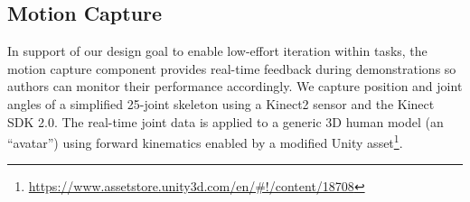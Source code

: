 \subsection{Motion Capture}

In support of our design goal to enable low-effort iteration within tasks, the motion capture component provides real-time feedback during demonstrations so authors can monitor their performance accordingly.
%
We capture position and joint angles of a simplified 25-joint skeleton using a Kinect2 sensor and the Kinect SDK 2.0. %
%
The real-time joint data is applied to a generic 3D human model (an ``avatar'') using forward kinematics enabled by a modified Unity asset\footnote{\url{https://www.assetstore.unity3d.com/en/\#!/content/18708}}.


